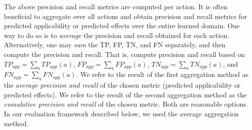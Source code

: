 \documentclass[letterpaper]{article} %
\newcommand{\app}{\ensuremath{\textit{app}}\xspace}
\newif\ifaddcomments
\newcommand{\roni}[1]{\ifaddcomments{\textcolor{red}{[Roni: #1]}}\fi}
\newcommand{\gregor}[1]{\ifaddcomments{\textcolor{orange}{[Gregor: #1]}}\fi}
\newcommand{\leo}[1]{\ifaddcomments{\textcolor{pink}{[Leonardo: #1]}}\fi}
\begin{document}
The above precision and recall metrics are computed per action. It is often beneficial to aggregate over all actions and obtain precision and recall metrics for predicted applicability or predicted effects over the entire learned domain. 
One way to do so is to \emph{average} the precision and recall obtained for each action. 
Alternatively, one may \emph{sum} the 
TP, FP, TN, and FN separately, and then compute the precision and recall. 
That is, compute precision and recall based on $TP_\app=\sum_a TP_\app(a)$, 
$FP_\app=\sum_a FP_\app(a)$,
$TN_\app=\sum_a TN_\app(a)$, and
$FN_\app=\sum_a FN_\app(a)$. 
We refer to the result of the first aggregation method as the \emph{average precision and recall} of the chosen metric (predicted applicability or predicted effects). 
We refer to the result of the second aggregation method as the \emph{cumulative precision and recall} of the chosen metric.  
Both are reasonable options. 
In our evaluation framework described below, we used the average aggregation method. 



 
\end{document}
